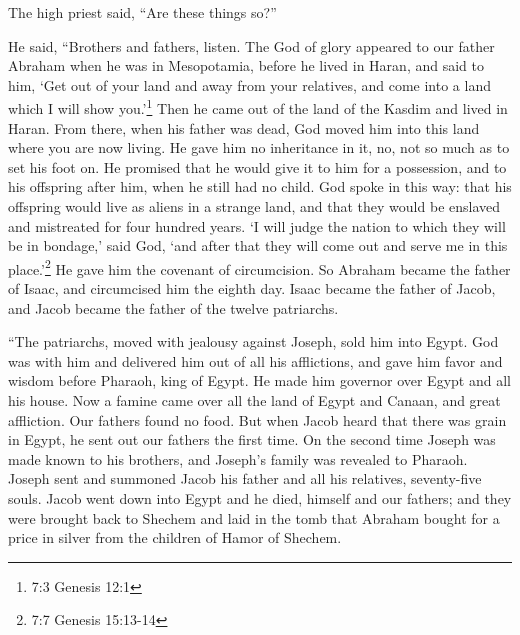 \mychapter{} \myverse*{}The high priest said, “Are these things so?”

\myverse{}He said, “Brothers and fathers, listen. The God of glory appeared
to our father Abraham when he was in Mesopotamia, before he lived in Haran,
\myverse{}and said to him, ‘Get out of your land and away from your relatives, and come
into a land which I will show you.’\footnote{7:3 Genesis 12:1}
\myverse{}Then he came out of the land of the Kasdim and lived in Haran. From there, when
his father was dead, God moved him into this land where you are now living.
\myverse{}He gave him no inheritance in it, no, not so much as to set his foot on. He
promised that he would give it to him for a possession, and to his offspring after him, when he still
had no child.
\myverse{}God spoke in this way: that his offspring would live as aliens in a strange
land, and that they would be enslaved and mistreated for four hundred years.
\myverse{}‘I will judge the nation to which they will be in bondage,’ said God, ‘and after
that they will come out and serve me in this place.’\footnote{7:7 Genesis 15:13-14}
\myverse{}He gave him the covenant of circumcision. So Abraham became the father of Isaac,
and circumcised him the eighth day. Isaac became the father of Jacob, and Jacob became the father of the
twelve patriarchs.

\myverse{}“The patriarchs, moved with jealousy against Joseph, sold him into
Egypt. God was with him
\myverse{}and delivered him out of all his afflictions, and gave him favor and wisdom
before Pharaoh, king of Egypt. He made him governor over Egypt and all his house.
\myverse{}Now a famine came over all the land of Egypt and Canaan, and great affliction.
Our fathers found no food.
\myverse{}But when Jacob heard that there was grain in Egypt, he sent out our fathers
the first time.
\myverse{}On the second time Joseph was made known to his brothers, and Joseph’s family
was revealed to Pharaoh.
\myverse{}Joseph sent and summoned Jacob his father and all his relatives, seventy-five
souls.
\myverse{}Jacob went down into Egypt and he died, himself and our fathers;
\myverse{}and they were brought back to Shechem and laid in the tomb that Abraham bought
for a price in silver from the children of Hamor of Shechem.

